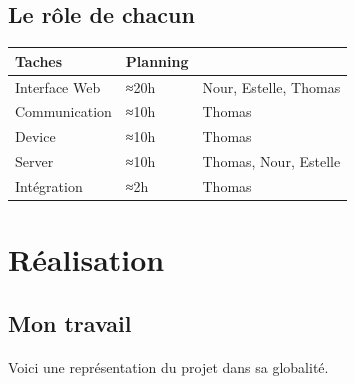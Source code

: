 \documentclass[12pt]{article}
\begin{document}
	\subsection{Le rôle de chacun}
	\noindent
	\begin{tabular}{|p{}|p{}|p{}|}
		\hline
		Taches&Planning&\\\hline
		Interface Web&≈20h&Nour, Estelle, Thomas\\
		Communication&≈10h&Thomas\\
		Device&≈10h&Thomas\\
		Server&≈10h&Thomas, Nour, Estelle\\
		Intégration&≈2h&Thomas\\
		\hline
	\end{tabular}

	\newpage
	\section{Réalisation}
	\subsection{Mon travail}
	\paragraph{}
	Voici une représentation du projet dans sa globalité.
	
\end{document}
